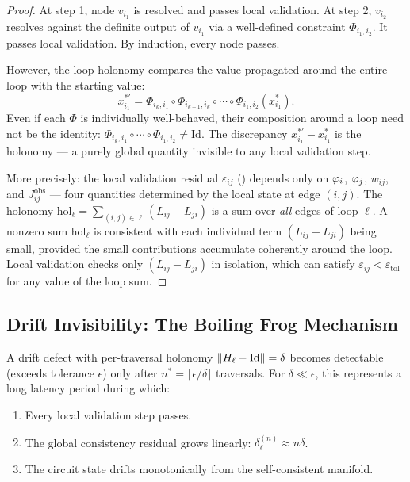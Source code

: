 \begin{proof}
At step 1, node $v_{i_1}$ is resolved and passes local validation.  At
step 2, $v_{i_2}$ resolves against the definite output of $v_{i_1}$ via
a well-defined constraint $\Phi_{i_1, i_2}$.  It passes local validation.
By induction, every node passes.

However, the loop holonomy compares the value propagated around the entire
loop with the starting value:
\begin{equation}
  x_{i_1}^{*\prime}
  = \Phi_{i_k, i_1} \circ \Phi_{i_{k-1}, i_k} \circ \cdots \circ \Phi_{i_1, i_2}(x_{i_1}^{*}).
\end{equation}
Even if each $\Phi$ is individually well-behaved, their composition around
a loop need not be the identity:
$\Phi_{i_k, i_1} \circ \cdots \circ \Phi_{i_1, i_2} \neq \mathrm{Id}$.
The discrepancy $x_{i_1}^{*\prime} - x_{i_1}^{*}$ is the holonomy --- a
purely global quantity invisible to any local validation step.

More precisely: the local validation residual $\varepsilon_{ij}$
() depends only on $\varphi_i$,
$\varphi_j$, $w_{ij}$, and $J_{ij}^{\mathrm{obs}}$ --- four
quantities determined by the local state at edge $(i,j)$.  The holonomy
$\mathrm{hol}_\ell = \sum_{(i,j)\in\ell}(L_{ij} - L_{ji})$ is a sum
over \emph{all} edges of loop $\ell$.  A nonzero sum $\mathrm{hol}_\ell$
is consistent with each individual term $(L_{ij} - L_{ji})$ being small,
provided the small contributions accumulate coherently around the loop.
Local validation checks only $(L_{ij} - L_{ji})$ in isolation, which can
satisfy $\varepsilon_{ij} < \varepsilon_{\mathrm{tol}}$ for any value of
the loop sum.
\end{proof}

\subsection{Drift Invisibility: The Boiling Frog Mechanism}

\begin{theorem}
\label{thm:drift-invisibility}
A drift defect with per-traversal holonomy $\|H_\ell - \mathrm{Id}\| = \delta$
becomes detectable (exceeds tolerance $\epsilon$) only after
$n^{*} = \lceil\epsilon/\delta\rceil$ traversals.  For $\delta \ll \epsilon$,
this represents a long latency period during which:
\begin{enumerate}[label=(\roman*), noitemsep]
  \item Every local validation step passes.
  \item The global consistency residual grows linearly:
        $\delta_\ell^{(n)} \approx n\delta$.
  \item The circuit state drifts monotonically from the self-consistent
        manifold.
\end{enumerate}
\end{theorem}


